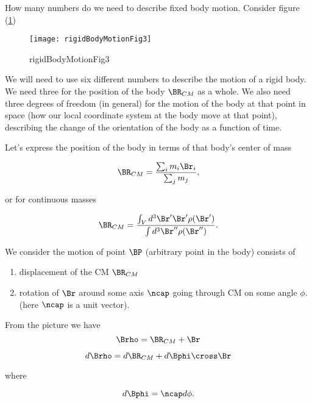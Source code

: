 How many numbers do we need to describe fixed body motion.  Consider figure (\ref{fig:rigidBodyMotion:rigidBodyMotionFig3})
\begin{figure}[htp]
   \centering
   \texttt{[image: rigidBodyMotionFig3]}
   \caption{rigidBodyMotionFig3}\label{fig:rigidBodyMotion:rigidBodyMotionFig3}
\end{figure}

We will need to use six different numbers to describe the motion of a rigid body.  We need three for the position of the body $\BR_{CM}$ as a whole.  We also need three degrees of freedom (in general) for the motion of the body at that point in space (how our local coordinate system at the body move at that point), describing the change of the orientation of the body as a function of time.

Let's express the position of the body in terms of that body's center of mass

\begin{equation}\label{eqn:rigidBodyMotion:60}
\BR_{CM} = \frac{\sum_i m_i \Br_i}{\sum_j m_j},
\end{equation}

or for continuous masses

\begin{equation}\label{eqn:rigidBodyMotion:80}
\BR_{CM} = \frac{\int_V d^3 \Br' \Br' \rho(\Br')}{ \int d^3 \Br'' \rho(\Br'')}.
\end{equation}

We consider the motion of point $\BP$  (arbitrary point in the body) consists of

\begin{enumerate}
\item displacement of the CM $\BR_{CM}$
\item rotation of $\Br$ around some axis $\ncap$ going through CM on some angle $\phi$. (here $\ncap$ is a unit vector).
\end{enumerate}

From the picture we have
\begin{equation}\label{eqn:rigidBodyMotion:100}
\Brho = \BR_{CM} + \Br
\end{equation}

\begin{equation}\label{eqn:rigidBodyMotion:120}
d\Brho = d\BR_{CM} + d\Bphi \cross \Br
\end{equation}

where

\begin{equation}\label{eqn:rigidBodyMotion:140}
d\Bphi = \ncap d\phi.
\end{equation}

